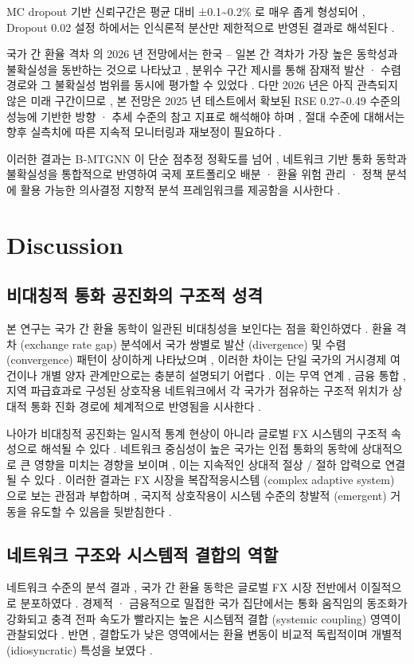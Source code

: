 \documentclass[10pt,a4paper]{article}
\begin{document}
MC dropout 기반 신뢰구간은 평균 대비 ±0.1\textasciitilde{}0.2\% 로 매우 좁게 형성되어 , Dropout 0.02 설정 하에서는 인식론적 분산만 제한적으로 반영된 결과로 해석된다 .

국가 간 환율 격차 의 2026 년 전망에서는 한국 – 일본 간 격차가 가장 높은 동학성과 불확실성을 동반하는 것으로 나타났고 , 분위수 구간 제시를 통해 잠재적 발산 · 수렴 경로와 그 불확실성 범위를 동시에 평가할 수 있었다 . 다만 2026 년은 아직 관측되지 않은 미래 구간이므로 , 본 전망은 2025 년 테스트에서 확보된 RSE 0.27\textasciitilde{}0.49 수준의 성능에 기반한 방향 · 추세 수준의 참고 지표로 해석해야 하며 , 절대 수준에 대해서는 향후 실측치에 따른 지속적 모니터링과 재보정이 필요하다 .

이러한 결과는 B‑MTGNN 이 단순 점추정 정확도를 넘어 , 네트워크 기반 통화 동학과 불확실성을 통합적으로 반영하여 국제 포트폴리오 배분 · 환율 위험 관리 · 정책 분석에 활용 가능한 의사결정 지향적 분석 프레임워크를 제공함을 시사한다 .

\section{Discussion}
\subsection{비대칭적 통화 공진화의 구조적 성격}
본 연구는 국가 간 환율 동학이 일관된 비대칭성을 보인다는 점을 확인하였다 . 환율 격차 (exchange rate gap) 분석에서 국가 쌍별로 발산 (divergence) 및 수렴 (convergence) 패턴이 상이하게 나타났으며 , 이러한 차이는 단일 국가의 거시경제 여건이나 개별 양자 관계만으로는 충분히 설명되기 어렵다 . 이는 무역 연계 , 금융 통합 , 지역 파급효과로 구성된 상호작용 네트워크에서 각 국가가 점유하는 구조적 위치가 상대적 통화 진화 경로에 체계적으로 반영됨을 시사한다 .

나아가 비대칭적 공진화는 일시적 통계 현상이 아니라 글로벌 FX 시스템의 구조적 속성으로 해석될 수 있다 . 네트워크 중심성이 높은 국가는 인접 통화의 동학에 상대적으로 큰 영향을 미치는 경향을 보이며 , 이는 지속적인 상대적 절상 / 절하 압력으로 연결될 수 있다 . 이러한 결과는 FX 시장을 복잡적응시스템 (complex adaptive system) 으로 보는 관점과 부합하며 , 국지적 상호작용이 시스템 수준의 창발적 (emergent) 거동을 유도할 수 있음을 뒷받침한다 .

\subsection{네트워크 구조와 시스템적 결합의 역할}
네트워크 수준의 분석 결과 , 국가 간 환율 동학은 글로벌 FX 시장 전반에서 이질적으로 분포하였다 . 경제적 · 금융적으로 밀접한 국가 집단에서는 통화 움직임의 동조화가 강화되고 충격 전파 속도가 빨라지는 높은 시스템적 결합 (systemic coupling) 영역이 관찰되었다 . 반면 , 결합도가 낮은 영역에서는 환율 변동이 비교적 독립적이며 개별적 (idiosyncratic) 특성을 보였다 .
\end{document}

